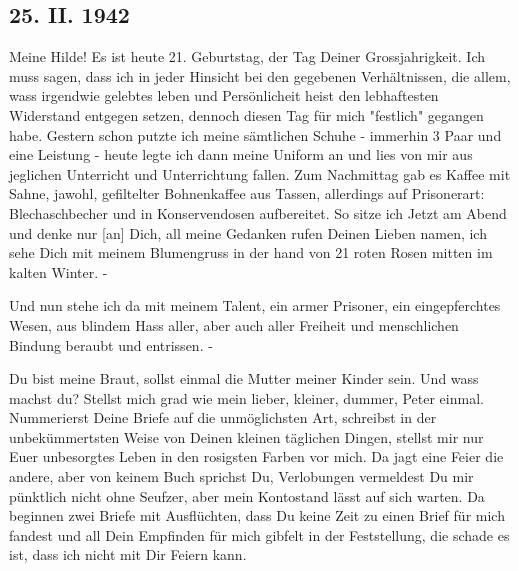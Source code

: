 \subsection{25. II. 1942}

Meine Hilde!
Es ist heute 21. Geburtstag, der Tag Deiner Grossjahrigkeit.
Ich muss sagen, dass ich in jeder Hinsicht bei den gegebenen Verh\"{a}ltnissen, die allem, wass irgendwie gelebtes leben und Pers\"{o}nlicheit heist den lebhaftesten Widerstand entgegen setzen, dennoch diesen Tag f\"{u}r mich "festlich" gegangen habe.
Gestern schon putzte ich meine s\"{a}mtlichen Schuhe - immerhin 3 Paar und eine Leistung - heute legte ich dann meine Uniform an und lies von mir aus jeglichen Unterricht und Unterrichtung fallen.
Zum Nachmittag gab es Kaffee mit Sahne, jawohl, gefiltelter Bohnenkaffee aus Tassen, allerdings auf Prisonerart: Blechaschbecher und in Konservendosen aufbereitet.
So sitze ich Jetzt am Abend und denke nur {\color{red} [an] } Dich, all meine Gedanken rufen Deinen Lieben namen, ich sehe Dich mit meinem Blumengruss in der hand von 21 roten Rosen mitten im kalten Winter. -

Und nun stehe ich da mit meinem Talent, ein armer Prisoner, ein eingepferchtes Wesen, aus blindem Hass aller, aber auch aller Freiheit und menschlichen Bindung beraubt und entrissen. -

Du bist meine Braut, sollst einmal die Mutter meiner Kinder sein.
Und wass machst du?
Stellst mich grad wie mein lieber, kleiner, dummer, Peter einmal.
Nummerierst Deine Briefe auf die unm\"{o}glichsten Art, schreibst in der unbek\"{u}mmertsten Weise von Deinen kleinen t\"{a}glichen Dingen, stellst mir nur Euer unbesorgtes Leben in den rosigsten Farben vor mich.
Da jagt eine Feier die andere, aber von keinem Buch sprichst Du, Verlobungen vermeldest Du mir p\"{u}nktlich nicht ohne Seufzer, aber mein Kontostand l\"{a}sst auf sich warten.
Da beginnen zwei Briefe mit Ausfl\"{u}chten, dass Du keine Zeit zu einen Brief f\"{u}r mich fandest und all Dein Empfinden f\"{u}r mich gibfelt in der Feststellung, die schade es ist, dass ich nicht mit Dir Feiern kann.

\clearpage
